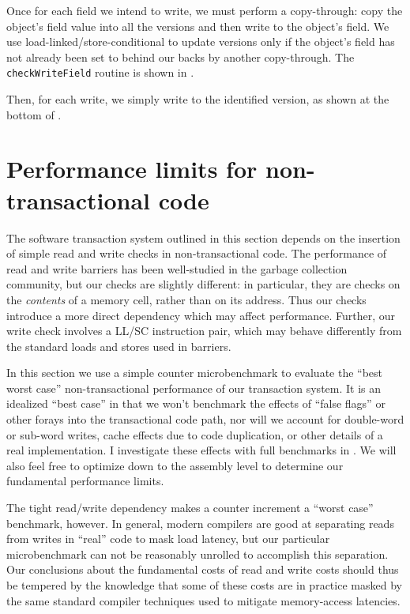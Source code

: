 Once for each field we intend to write, we must perform a
copy-through: copy the object's field value into all the versions and
then write \FLAG to the object's field.  We use
load-linked/store-conditional to update versions only if the object's
field has not already been set to \FLAG behind our backs by another
copy-through.  The {\tt checkWriteField} routine is shown in
.

Then, for each write, we simply write to the identified version, as
shown at the bottom of .

\section{Performance limits for non-transactional code}
\label{sec:counter-bench}
The software transaction system outlined in this section depends on
the insertion of simple read and write checks in non-transactional
code.  The performance of read and write barriers has been
well-studied in the garbage collection community, but our checks are
slightly different: in particular, they are checks on the
\textit{contents} of a memory cell, rather than on its address.  
Thus our checks
introduce a more direct dependency which may affect performance.
Further, our write check involves a LL/SC instruction pair, which may
behave differently from the standard loads and stores used in
barriers.

In this section we use a simple counter microbenchmark to evaluate the
``best worst case'' non-transactional performance of our transaction
system.  It is an idealized ``best case'' in that we won't benchmark
the effects of ``false flags'' or other forays into the transactional
code path, nor will we account for double-word or sub-word writes,
cache effects due to code duplication, or other details of a real
implementation.  I investigate these effects with full
benchmarks in .  We will also feel free to
optimize down to the assembly level to determine our fundamental
performance limits.  

The tight read/write dependency makes a counter increment
a ``worst case'' benchmark, however.  In general,
modern compilers are good at separating reads from writes in
``real'' code to mask load latency, but our particular microbenchmark
can not be reasonably unrolled to accomplish this separation.  Our
conclusions about the fundamental costs of read and write costs should
thus be tempered by the knowledge that some of these costs are in
practice masked by the same standard compiler techniques used to
mitigate memory-access latencies.

